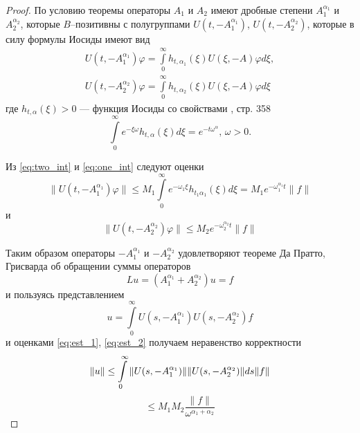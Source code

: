\documentclass{cmfnre}
\theoremstyle{plain}
\numberwithin{equation}{section}
\begin{document}
\begin{proof}
    По условию теоремы операторы $A_1$ и $A_2$ имеют дробные степени $A_1^{\alpha_1}$ и $A_2^{\alpha_2}$,
    которые $B$--позитивны с полугруппами $U(t, -A_1^{\alpha_1})$, $U(t, -A_2^{\alpha_2})$,
    которые в силу формулы Иосиды имеют вид
    \begin{equation}
        \label{eq:two_int}
        \begin{aligned}
            U(t, -A_1^{\alpha_1})\varphi = \int\limits_0^\infty h_{t, \alpha_1}(\xi) U(\xi, -A) \varphi d\xi,\\
            U(t, -A_2^{\alpha_2})\varphi = \int\limits_0^\infty h_{t, \alpha_2}(\xi) U(\xi, -A) \varphi d\xi
        \end{aligned}
    \end{equation}
    где $h_{t, \alpha}(\xi) > 0$ --- функция Иосиды со свойствами \cite{Iosida}, стр. 358
    \begin{equation}
        \label{eq:one_int}
        \int\limits_0^\infty e^{-\xi \omega} h_{t, \alpha}(\xi) d\xi = e^{-t\omega^{\alpha}},\, \omega > 0.
    \end{equation}

    Из \eqref{eq:two_int} и \eqref{eq:one_int} следуют оценки
    \begin{equation}
        \label{eq:est_1}
        \|U(t, -A_1^{\alpha_1})\varphi\| \le M_1 \int\limits_0^\infty e^{-\omega_1\xi}h_{t_1\alpha_1}(\xi) d\xi
        = M_1 e^{-\omega_1^{\alpha_1}t}\|f\|
    \end{equation}
    и
    \begin{equation}
        \label{eq:est_2}
        \|U(t, -A_2^{\alpha_2})\varphi\| \le M_2 e^{-\omega_2^{\alpha_2}t}\|f\|
    \end{equation}

    Таким образом операторы $-A_1^{\alpha_1}$ и $-A_2^{\alpha_2}$ удовлетворяют теореме Да Пратто, Грисварда \cite{Tihonov}
    об обращении суммы операторов
    \begin{equation}
        Lu = (A_1^{\alpha_1} + A_2^{\alpha_2})u = f
    \end{equation}
    и пользуясь представлением \cite{Kostin}
    \begin{equation}
        u = \int\limits_0^\infty U(s, -A_1^{\alpha_1}) U(s, -A_2^{\alpha_2})f
    \end{equation}
    и оценками \eqref{eq:est_1}, \eqref{eq:est_2} получаем неравенство корректности
    \begin{equation*}
        \|u\| \le \int\limits_0^\infty \|U(s, -A_1^{\alpha_1})\| \|U(s, -A_2^{\alpha_2})\| ds \|f\|\\
    \end{equation*}
    \begin{equation}
        \le M_1 M_2 \frac{\|f\|}{\omega^{\alpha_1 + \alpha_2}}
    \end{equation}
\end{proof}
\end{document}
